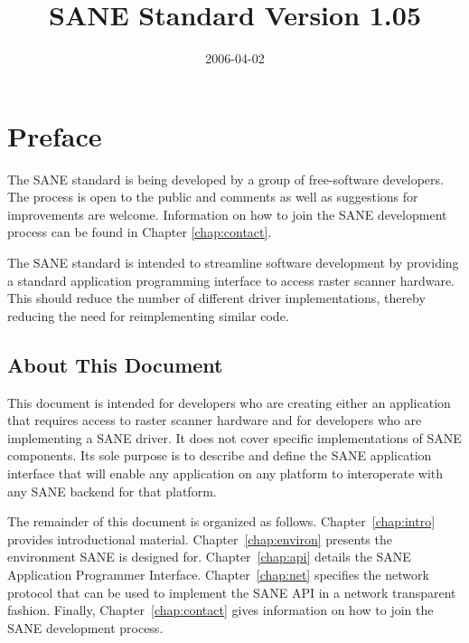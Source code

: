 \documentclass[11pt,DVIps]{report}
\title{\huge SANE Standard Version 1.05}
\author{}
\date{2006-04-02}
\begin{document}
\newcommand{\filename}[1]{{\tt #1}}
\newcommand{\code}[1]{{\tt #1}}
\newcommand{\var}[1]{{\it #1}}
\newcommand{\defn}[1]{#1\index{#1}}

\begin{latexonly}
  \setcounter{changebargrey}{0}   %
\end{latexonly}

\maketitle
\tableofcontents
\listoffigures
\listoftables


\chapter{Preface}

The SANE standard is being developed by a group of free-software
developers.  The process is open to the public and comments as well as
suggestions for improvements are welcome.  Information on how to join
the SANE development process can be found in Chapter
\ref{chap:contact}.

The SANE standard is intended to streamline software development by
providing a standard application programming interface to access
raster scanner hardware.  This should reduce the number of different
driver implementations, thereby reducing the need for reimplementing
similar code.


\section{About This Document}

This document is intended for developers who are creating either an
application that requires access to raster scanner hardware and for
developers who are implementing a SANE driver.  It does not cover
specific implementations of SANE components.  Its sole purpose is to
describe and define the SANE application interface that will enable
any application on any platform to interoperate with any SANE backend
for that platform.

The remainder of this document is organized as follows.
Chapter~\ref{chap:intro} provides introductional material.
Chapter~\ref{chap:environ} presents the environment SANE is designed
for.  Chapter~\ref{chap:api} details the SANE Application Programmer
Interface.  Chapter~\ref{chap:net} specifies the network protocol that
can be used to implement the SANE API in a network transparent
fashion.  Finally, Chapter~\ref{chap:contact} gives information on how
to join the SANE development process.
\end{document}
